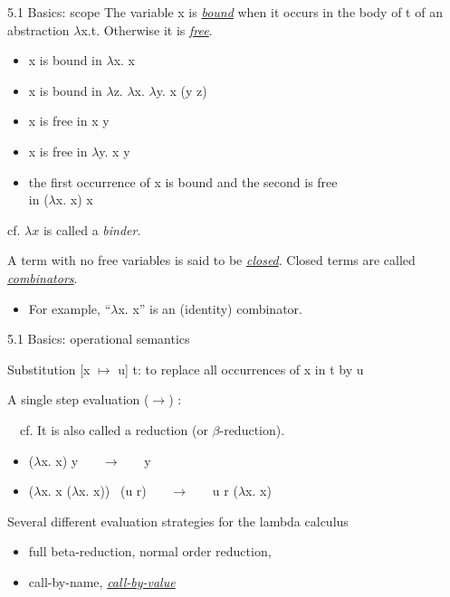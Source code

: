 \documentclass[table]{beamer}
\begin{document}
\begin{frame}[t]{5.1 Basics: scope}
The variable x is \underline{\it bound} when it occurs in the body of t of an abstraction $\lambda$x.t. Otherwise it is \underline{\it free}. 

\begin{itemize}
\item x is bound in $\lambda$x. {\color{red}x}
\item x is bound in $\lambda$z. $\lambda$x. $\lambda$y.  {\color{red}x} (y z) 
\item x is free in  {\color{red}x} y
\item x is free in $\lambda$y.  {\color{red}x} y
\item the first occurrence of x is bound and the second is free \\ in ($\lambda$x.  {\color{red}x})  {\color{red}x}
\end{itemize}

\vspace{10pt}

cf. $\lambda x$ is called a {\it binder}.

\vspace{10pt}

A term with no free variables is said to be \underline{\it closed}. Closed terms are called \underline{\it combinators}. 
\begin{itemize}
\item For example, ``$\lambda$x. x''  is an (identity) combinator.
\end{itemize}

\end{frame}

\begin{frame}[t]{5.1 Basics: operational semantics}

Substitution [x $\mapsto$ u] t: to replace all occurrences of x in t by u

\vspace{10pt}

A single step evaluation ($\rightarrow$) : \ \ 

\ \ cf. It is also called a reduction (or $\beta$-reduction). 

\vspace{10pt}

\begin{itemize}
\item ($\lambda$x. x) y  \ \ \ $\rightarrow$ \ \ \ y
\item ($\lambda$x. x ($\lambda$x. x)) \ (u r) \ \ \ $\rightarrow$ \ \ \  u r ($\lambda$x. x)
\end{itemize}

\vspace{10pt}

Several different evaluation strategies for the lambda calculus
\begin{itemize}
\item full beta-reduction, normal order reduction, 
\item call-by-name, \underline{\it call-by-value}
\end{itemize}

\end{frame}
\end{document}
